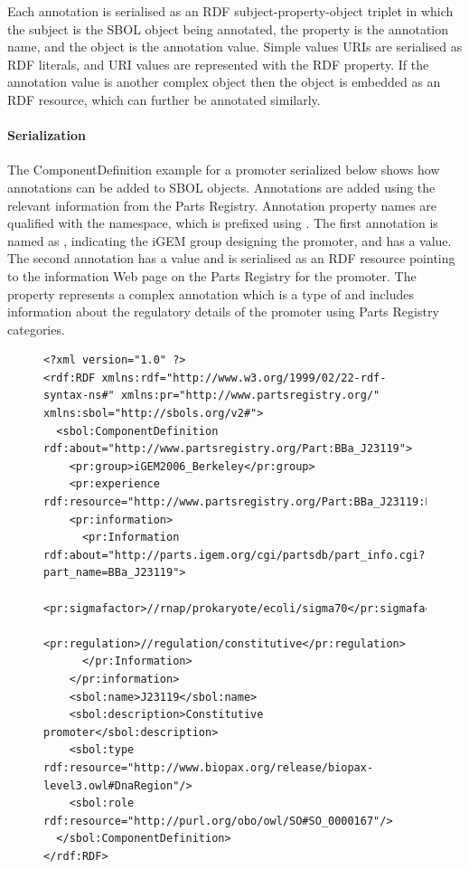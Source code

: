 Each annotation is serialised as an RDF subject-property-object triplet in which the subject is the SBOL object being annotated, the property is the annotation name, and the object is the annotation value. Simple values URIs are serialised as RDF literals, and URI values are represented with the  RDF property. If the annotation value is another complex object then the object is embedded as an RDF resource, which can further be annotated similarly.

\paragraph{Serialization}
The ComponentDefinition example for a promoter serialized below shows how annotations can be added to SBOL objects. Annotations are added using the relevant information from the Parts Registry. Annotation property names are qualified with the  namespace, which is prefixed using . The first annotation is named as , indicating the iGEM group designing the promoter, and has a  value. The second  annotation has a  value and is serialised as an RDF resource pointing to the information Web page on the Parts Registry for the promoter. The   property represents a complex annotation which is a type of  and includes information about the regulatory details of the promoter using Parts Registry categories.   

\begin{figure} [ht]
\begin{lstlisting}
<?xml version="1.0" ?>
<rdf:RDF xmlns:rdf="http://www.w3.org/1999/02/22-rdf-syntax-ns#" xmlns:pr="http://www.partsregistry.org/" xmlns:sbol="http://sbols.org/v2#">
  <sbol:ComponentDefinition rdf:about="http://www.partsregistry.org/Part:BBa_J23119">
    <pr:group>iGEM2006_Berkeley</pr:group>
    <pr:experience rdf:resource="http://www.partsregistry.org/Part:BBa_J23119:Experience"/>
    <pr:information>
      <pr:Information rdf:about="http://parts.igem.org/cgi/partsdb/part_info.cgi?part_name=BBa_J23119">
        <pr:sigmafactor>//rnap/prokaryote/ecoli/sigma70</pr:sigmafactor>
        <pr:regulation>//regulation/constitutive</pr:regulation>
      </pr:Information>
    </pr:information>
    <sbol:name>J23119</sbol:name>
    <sbol:description>Constitutive promoter</sbol:description>
    <sbol:type rdf:resource="http://www.biopax.org/release/biopax-level3.owl#DnaRegion"/>
    <sbol:role rdf:resource="http://purl.org/obo/owl/SO#SO_0000167"/>
  </sbol:ComponentDefinition>
</rdf:RDF>
\end{lstlisting}
\label{ser:Annotation}
\end{figure}




